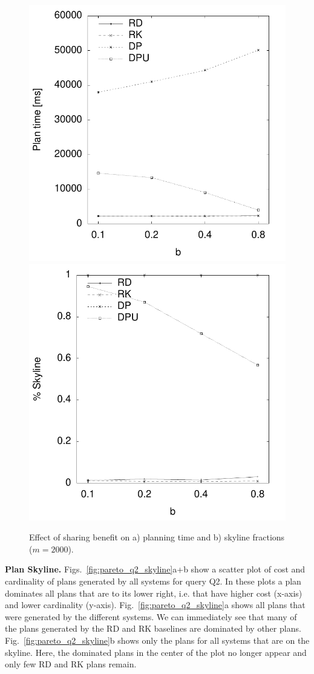 \begin{figure}[htb]
  \centering
  \includegraphics[width=0.49\linewidth]{figs/pareto_plan_b.pdf}
  \includegraphics[width=0.49\linewidth]{figs/plans_skyline_by_b.pdf}
  \caption{Effect of sharing benefit on a) planning time and b)
    skyline fractions ($m=2000$).}
  \label{fig:pareto_sharing}
\end{figure}

\textbf{Plan Skyline.} Figs.~\ref{fig:pareto_q2_skyline}a+b show a scatter
plot of cost and cardinality of plans generated by all systems for
query Q2. In these plots a plan dominates all plans that are to its
lower right, i.e. that have higher cost (x-axis) and lower cardinality
(y-axis). Fig.~\ref{fig:pareto_q2_skyline}a shows all plans that were
generated by the different systems. We can immediately see that many
of the plans generated by the RD and RK baselines are dominated by
other plans. Fig.~\ref{fig:pareto_q2_skyline}b shows only the plans
for all systems that are on the skyline. Here, the dominated plans in
the center of the plot no longer appear and only few RD and RK plans
remain.

